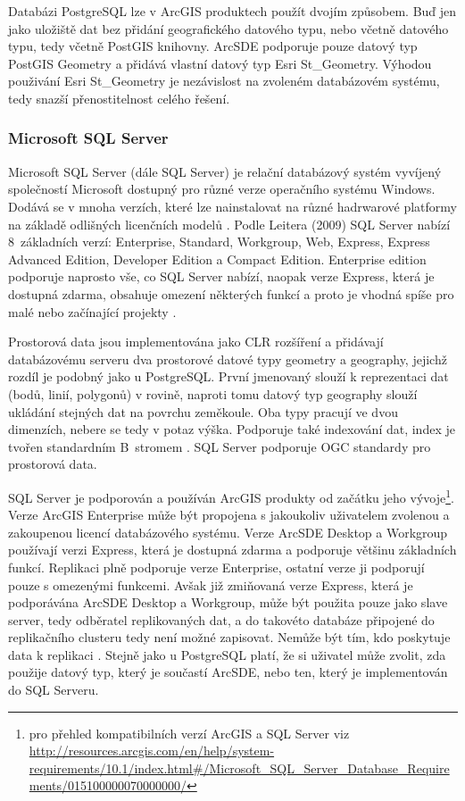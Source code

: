 Databázi PostgreSQL lze v ArcGIS produktech použít dvojím způsobem. Buď jen jako uložiště dat bez přidání geografického datového typu, nebo včetně datového typu, tedy včetně PostGIS knihovny. ArcSDE podporuje pouze datový typ PostGIS Geometry a přidává vlastní datový typ Esri St\_Geometry. Výhodou použivání Esri St\_Geometry je nezávislost na zvoleném databázovém systému, tedy snazší přenostitelnost celého řešení. 


        \subsubsection{Microsoft SQL Server}
        \label{MSSQL}
Microsoft SQL Server (dále SQL Server) je relační databázový systém vyvíjený společností Microsoft dostupný pro různé verze operačního systému Windows. Dodává se v mnoha verzích, které lze nainstalovat na různé hadrwarové platformy na základě odlišných licenčních modelů \citep{Whalen2008}. Podle Leitera (2009) SQL Server nabízí 8~základních verzí: Enterprise, Standard, Workgroup, Web, Express, Express Advanced Edition, Developer Edition a Compact Edition. Enterprise edition podporuje naprosto vše, co SQL Server nabízí, naopak verze Express, která je dostupná zdarma, obsahuje omezení některých funkcí a proto je vhodná spíše pro malé nebo začínající projekty \citep{Leiter2009}.

Prostorová data jsou implementována jako CLR rozšíření a přidávají databázovému serveru dva prostorové datové typy geometry a geography, jejichž rozdíl je podobný jako u PostgreSQL. První jmenovaný slouží k reprezentaci dat (bodů, linií, polygonů) v rovině, naproti tomu datový typ geography slouží ukládání stejných dat na povrchu zeměkoule. Oba typy pracují ve dvou dimenzích, nebere se tedy v potaz výška. Podporuje také indexování dat, index je tvořen standardním B~stromem \citep{Cincura2009}. SQL Server podporuje OGC standardy pro prostorová data.

SQL Server je podporován a používán ArcGIS produkty od začátku jeho vývoje\footnote{pro přehled kompatibilních verzí ArcGIS a SQL Server viz \url{http://resources.arcgis.com/en/help/system-requirements/10.1/index.html\#/Microsoft\_SQL\_Server\_Database\_Requirements/015100000070000000/}}. Verze ArcGIS Enterprise může být propojena s jakoukoliv uživatelem zvolenou a zakoupenou licencí databázového systému. Verze ArcSDE Desktop a Workgroup používají verzi Express, která je dostupná zdarma a podporuje většinu základních funkcí. Replikaci plně podporuje verze Enterprise, ostatní verze ji podporují pouze s omezenými funkcemi. Avšak již zmiňovaná verze Express, která je podporávána ArcSDE Desktop a Workgroup, může být použita pouze jako slave server, tedy odběratel replikovaných dat, a do takovéto databáze připojené do replikačního clusteru tedy není možné zapisovat. Nemůže být tím, kdo poskytuje data k replikaci \citep{Whalen2008}. Stejně jako u PostgreSQL platí, že si uživatel může zvolit, zda použije datový typ, který je součastí ArcSDE, nebo ten, který je implementován do SQL Serveru.

